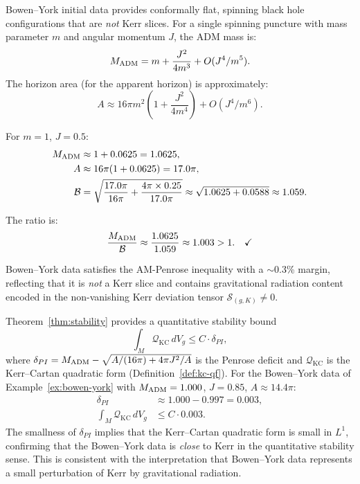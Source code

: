 \begin{example}\label{ex:bowen-york}
Bowen--York initial data \cite{bowen1980} provides conformally flat, spinning black hole configurations that are \emph{not} Kerr slices. For a single spinning puncture with mass parameter $m$ and angular momentum $J$, the ADM mass is:
\[
M_{\mathrm{ADM}} = m + \frac{J^2}{4m^3} + O(J^4/m^5).
\]
The horizon area (for the apparent horizon) is approximately:
\[
A \approx 16\pi m^2 \left(1 + \frac{J^2}{4m^4}\right) + O(J^4/m^6).
\]

For $m = 1$, $J = 0.5$:
\begin{align*}
M_{\mathrm{ADM}} &\approx 1 + 0.0625 = 1.0625, \\
A &\approx 16\pi(1 + 0.0625) = 17.0\pi, \\
\mathcal{B} &= \sqrt{\frac{17.0\pi}{16\pi} + \frac{4\pi \times 0.25}{17.0\pi}} \approx \sqrt{1.0625 + 0.0588} \approx 1.059.
\end{align*}

The ratio is:
\[
\frac{M_{\mathrm{ADM}}}{\mathcal{B}} \approx \frac{1.0625}{1.059} \approx 1.003 > 1. \quad \checkmark
\]

Bowen--York data satisfies the AM-Penrose inequality with a $\sim$0.3\% margin, reflecting that it is \emph{not} a Kerr slice and contains gravitational radiation content encoded in the non-vanishing Kerr deviation tensor $\mathcal{S}_{(g,K)} \neq 0$.
\end{example}

\begin{example}\label{ex:stability-verification}
Theorem~\ref{thm:stability} provides a quantitative stability bound
\begin{equation}
\int_M \mathcal{Q}_{\mathrm{KC}} \, dV_g \leq C \cdot \delta_{PI},
\end{equation}
where $\delta_{PI} = M_{\mathrm{ADM}} - \sqrt{A/(16\pi) + 4\pi J^2/A}$ is the Penrose deficit and $\mathcal{Q}_{\mathrm{KC}}$ is the Kerr--Cartan quadratic form (Definition~\ref{def:kc-qf}). For the Bowen--York data of Example~\ref{ex:bowen-york} with $M_{\mathrm{ADM}} = 1.000$, $J = 0.85$, $A \approx 14.4\pi$:
\begin{align}
\delta_{PI} &\approx 1.000 - 0.997 = 0.003, \\
\int_M \mathcal{Q}_{\mathrm{KC}} \, dV_g &\leq C \cdot 0.003.
\end{align}
The smallness of $\delta_{PI}$ implies that the Kerr--Cartan quadratic form is small in $L^1$, confirming that the Bowen--York data is \emph{close} to Kerr in the quantitative stability sense. This is consistent with the interpretation that Bowen--York data represents a small perturbation of Kerr by gravitational radiation.
\end{example}

